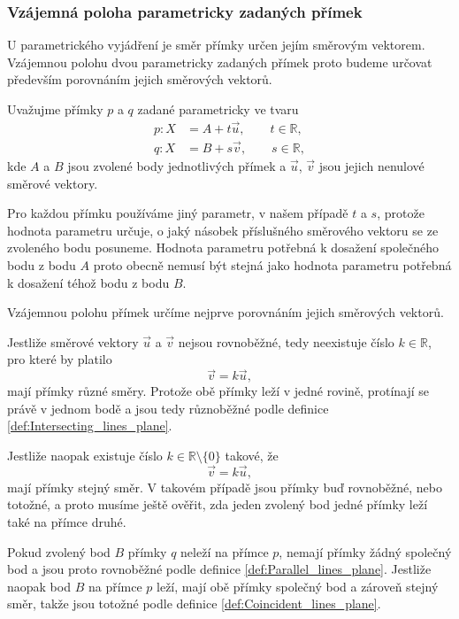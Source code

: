 \subsubsection{Vzájemná poloha parametricky zadaných přímek}
\label{subsubsec:Relative_position_parametric_lines}

U parametrického vyjádření je směr přímky určen jejím směrovým
vektorem. Vzájemnou polohu dvou parametricky zadaných přímek proto
budeme určovat především porovnáním jejich směrových vektorů.

Uvažujme přímky $p$ a $q$ zadané parametricky ve tvaru
\begin{align}
    p: X &= A+t\vec{u},
    \qquad t\in\mathbb{R},
    \label{eq:Parametric_line_p_relative_position}\\
    q: X &= B+s\vec{v},
    \qquad s\in\mathbb{R},
    \label{eq:Parametric_line_q_relative_position}
\end{align}
kde $A$ a $B$ jsou zvolené body jednotlivých přímek a $\vec{u}$,
$\vec{v}$ jsou jejich nenulové směrové vektory.

Pro každou přímku používáme jiný parametr, v našem případě $t$ a $s$,
protože hodnota parametru určuje, o jaký násobek příslušného směrového
vektoru se ze zvoleného bodu posuneme. Hodnota parametru potřebná
k dosažení společného bodu z bodu $A$ proto obecně nemusí být stejná
jako hodnota parametru potřebná k dosažení téhož bodu z bodu $B$.

Vzájemnou polohu přímek určíme nejprve porovnáním jejich směrových
vektorů.

Jestliže směrové vektory $\vec{u}$ a $\vec{v}$ nejsou rovnoběžné,
tedy neexistuje číslo $k\in\mathbb{R}$, pro které by platilo
\[
    \vec{v}=k\vec{u},
\]
mají přímky různé směry. Protože obě přímky leží v jedné rovině,
protínají se právě v jednom bodě a jsou tedy různoběžné podle definice \ref{def:Intersecting_lines_plane}.

Jestliže naopak existuje číslo
$k\in\mathbb{R}\setminus\{0\}$ takové, že
\[
    \vec{v}=k\vec{u},
\]
mají přímky stejný směr. V takovém případě jsou přímky buď rovnoběžné,
nebo totožné, a proto musíme ještě ověřit, zda jeden zvolený bod jedné
přímky leží také na přímce druhé.

Pokud zvolený bod $B$ přímky $q$ neleží na přímce $p$,
nemají přímky žádný společný bod a jsou proto rovnoběžné podle definice \ref{def:Parallel_lines_plane}. 
Jestliže naopak bod $B$ na přímce $p$ leží, mají obě přímky
společný bod a zároveň stejný směr, takže jsou totožné podle definice \ref{def:Coincident_lines_plane}.

